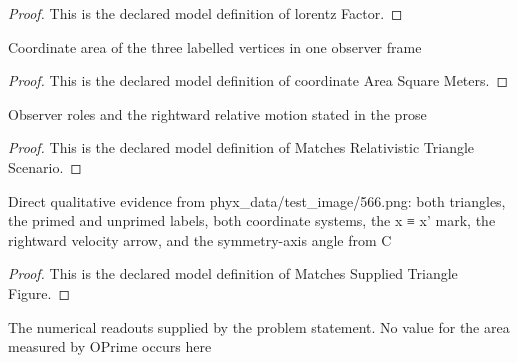 \begin{proof}
  This is the declared model definition of lorentz Factor.
\end{proof}
\begin{definition}
  \label{def:physics:phyx-mini-0566:phyxminiproblems-problemphyxmini0566-coordinateareasquaremeters}
  Coordinate area of the three labelled vertices in one observer frame
\end{definition}
\begin{proof}
  This is the declared model definition of coordinate Area Square Meters.
\end{proof}
\begin{definition}
  \label{def:physics:phyx-mini-0566:phyxminiproblems-problemphyxmini0566-matchesrelativistictrianglescenario}
  Observer roles and the rightward relative motion stated in the prose
\end{definition}
\begin{proof}
  This is the declared model definition of Matches Relativistic Triangle Scenario.
\end{proof}
\begin{definition}
  \label{def:physics:phyx-mini-0566:phyxminiproblems-problemphyxmini0566-matchessuppliedtrianglefigure}
  Direct qualitative evidence from phyx\_data/test\_image/566.png: both triangles, the primed and unprimed labels, both coordinate systems, the x ≡ x' mark, the rightward velocity arrow, and the symmetry-axis angle from C
\end{definition}
\begin{proof}
  This is the declared model definition of Matches Supplied Triangle Figure.
\end{proof}
\begin{definition}
  \label{def:physics:phyx-mini-0566:phyxminiproblems-problemphyxmini0566-matchesproblemdata}
  The numerical readouts supplied by the problem statement. No value for the area measured by OPrime occurs here
\end{definition}
